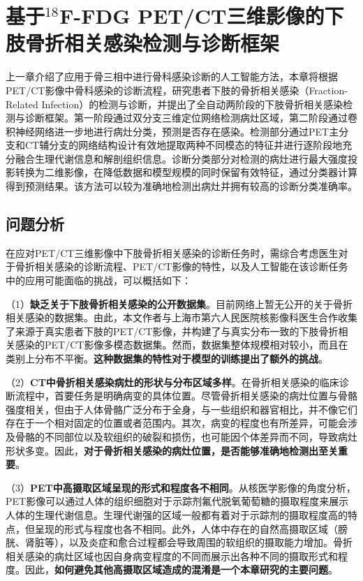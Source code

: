 \chapter{基于\texorpdfstring{\(^{18}\)}{18}F-FDG PET/CT三维影像的下肢骨折相关感染检测与诊断框架}

上一章介绍了应用于骨三相中进行骨科感染诊断的人工智能方法，本章将根据PET/CT影像中骨科感染的诊断流程，研究患者下肢的骨折相关感染（Fraction-Related Infection）的检测与诊断，并提出了全自动两阶段的下肢骨折相关感染检测与诊断框架。第一阶段通过双分支三维定位网络检测病灶区域，第二阶段通过卷积神经网络进一步地进行病灶分类，预测是否存在感染。检测部分通过PET主分支和CT辅分支的网络结构设计有效地提取两种不同模态的特征并进行逐阶段地充分融合生理代谢信息和解剖组织信息。诊断分类部分对检测的病灶进行最大强度投影转换为二维影像，在降低数据和模型规模的同时保留有效特征，通过分类器计算得到预测结果。该方法可以较为准确地检测出病灶并拥有较高的诊断分类准确率。

\section{问题分析}


在应对PET/CT三维影像中下肢骨折相关感染的诊断任务时，需综合考虑医生对于骨折相关感染的诊断流程、PET/CT影像的特性，以及人工智能在该诊断任务中的应用可能面临的挑战，可以概括如下：

（1）\textbf{缺乏关于下肢骨折相关感染的公开数据集}。目前网络上暂无公开的关于骨折相关感染的数据集。由此，本文作者与上海市第六人民医院核影像科医生合作收集了来源于真实患者下肢的PET/CT影像，并构建了与真实分布一致的下肢骨折相关感染的PET/CT影像多模态数据集。然而，数据集整体规模相对较小，而且在类别上分布不平衡。\textbf{这种数据集的特性对于模型的训练提出了额外的挑战}。

（2）\textbf{CT中骨折相关感染病灶的形状与分布区域多样}。在骨折相关感染的临床诊断流程中，首要任务是明确病变的具体位置。尽管骨折相关感染的病灶位置与骨骼强度相关，但由于人体骨骼广泛分布于全身，与一些组织和器官相比，并不像它们存在于一个相对固定的位置或者范围内。其次，病变的程度也有所差异，可能会涉及骨骼的不同部位以及软组织的破裂和损伤，也可能因个体差异而不同，导致病灶形状多变。因此，\textbf{对于骨折相关感染的病灶位置，是否能够准确地检测出至关重要}。

（3）\textbf{PET中高摄取区域呈现的形式和程度各不相同}。从核医学影像的角度分析，PET影像可以通过人体的组织细胞对于示踪剂氟代脱氧葡萄糖的摄取程度来展示人体的生理代谢信息。生理代谢强的区域一般都有着对于示踪剂的摄取程度高的特点，但呈现的形式与程度也各不相同。此外，人体中存在的自然高摄取区域（膀胱、肾脏等），以及炎症和愈合过程都会导致周围的软组织的摄取能力增加。骨折相关感染的病灶区域也因自身病变程度的不同而展示出各种不同的摄取形式和程度。因此，\textbf{如何避免其他高摄取区域造成的混淆是一个本章研究的主要问题}。


